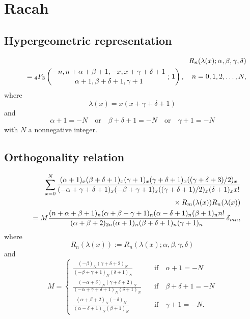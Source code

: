 \documentclass[envcountchap,graybox]{svmono}
\newcommand{\hyp}[5]{\mbox{}_{#1}{F}_{#2}
\left(\genfrac{}{}{0pt}{}{#3}{#4}\,;\,#5\right)}
\newcommand{\mathindent}{\hspace{7.5mm}}
\begin{document}
\section{Racah}

\par\setcounter{equation}{0}

\subsection*{Hypergeometric representation}
\begin{eqnarray}
\label{DefRacah}
& &R_n(\lambda(x);\alpha,\beta,\gamma,\delta)\nonumber\\
& &{}=\hyp{4}{3}{-n,n+\alpha+\beta+1,-x,x+\gamma+\delta+1}{\alpha+1,\beta+\delta+1,\gamma+1}{1},
\quad n=0,1,2,\ldots,N,
\end{eqnarray}
where
$$\lambda(x)=x(x+\gamma+\delta+1)$$
and
$$\alpha+1=-N\quad\textrm{or}\quad\beta+\delta+1=-N\quad\textrm{or}\quad\gamma+1=-N$$
with $N$ a nonnegative integer.

\subsection*{Orthogonality relation}
\begin{eqnarray}
\label{OrtRacah}
& &\sum_{x=0}^N\frac{(\alpha+1)_x(\beta+\delta+1)_x(\gamma+1)_x(\gamma+\delta+1)_x((\gamma+\delta+3)/2)_x}
{(-\alpha+\gamma+\delta+1)_x(-\beta+\gamma+1)_x((\gamma+\delta+1)/2)_x(\delta+1)_xx!}\nonumber\\
& &{}\mathindent\times R_m(\lambda(x))R_n(\lambda(x))\nonumber\\
& &{}=M\frac{(n+\alpha+\beta+1)_n(\alpha+\beta-\gamma+1)_n(\alpha-\delta+1)_n(\beta+1)_nn!}
{(\alpha+\beta+2)_{2n}(\alpha+1)_n(\beta+\delta+1)_n(\gamma+1)_n}\,\delta_{mn},
\end{eqnarray}
where
$$R_n(\lambda(x)):=R_n(\lambda(x);\alpha,\beta,\gamma,\delta)$$
and
$$M=\left\{\begin{array}{ll}
\displaystyle\frac{(-\beta)_N(\gamma+\delta+2)_N}{(-\beta+\gamma+1)_N(\delta+1)_N}&\quad\textrm{if}\quad\alpha+1=-N\\[5mm]
\displaystyle\frac{(-\alpha+\delta)_N(\gamma+\delta+2)_N}{(-\alpha+\gamma+\delta+1)_N(\delta+1)_N}&\quad\textrm{if}\quad\beta+\delta+1=-N\\[5mm]
\displaystyle\frac{(\alpha+\beta+2)_N(-\delta)_N}{(\alpha-\delta+1)_N(\beta+1)_N}&\quad\textrm{if}\quad\gamma+1=-N.
\end{array}\right.$$
\end{document}

